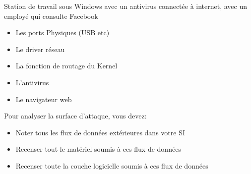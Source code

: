 \begin{frame}

Station de travail sous Windows avec un antivirus connectée à internet, avec un employé qui consulte Facebook
\begin{itemize}
    \item Les ports Physiques (USB etc)
    \item Le driver réseau
    \item La fonction de routage du Kernel
    \item L'antivirus
    \item Le navigateur web
\end{itemize}

\end{frame}





\begin{frame}

Pour analyser la surface d'attaque, vous devez:
\begin{itemize}
    \item Noter tous les flux de données extérieures dans votre SI
    \item Recenser tout le matériel soumis à ces flux de données
    \item Recenser toute la couche logicielle soumis à ces flux de données
\end{itemize}

\end{frame}




